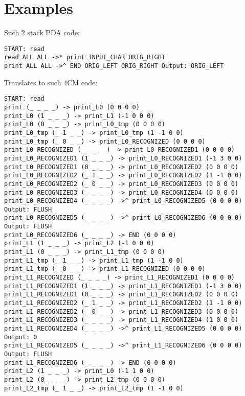 \documentclass[english,shortabstract,mgr]{iithesis}
\begin{document}

{}

\newpage
\appendix

\chapter{Examples}


Such $2$ stack PDA code:

\begin{verbatim}
START: read
read ALL ALL ->* print INPUT_CHAR ORIG_RIGHT
print ALL ALL ->^ END ORIG_LEFT ORIG_RIGHT Output: ORIG_LEFT
\end{verbatim}

Translates to such $4$CM code:

\begin{verbatim}
START: read
print (_ _ _ _) -> print_L0 (0 0 0 0)
print_L0 (1 _ _ _) -> print_L1 (-1 0 0 0)
print_L0 (0 _ _ _) -> print_L0_tmp (0 0 0 0)
print_L0_tmp (_ 1 _ _) -> print_L0_tmp (1 -1 0 0)
print_L0_tmp (_ 0 _ _) -> print_L0_RECOGNIZED (0 0 0 0)
print_L0_RECOGNIZED (_ _ _ _) -> print_L0_RECOGNIZED1 (0 0 0 0)
print_L0_RECOGNIZED1 (1 _ _ _) -> print_L0_RECOGNIZED1 (-1 3 0 0)
print_L0_RECOGNIZED1 (0 _ _ _) -> print_L0_RECOGNIZED2 (0 0 0 0)
print_L0_RECOGNIZED2 (_ 1 _ _) -> print_L0_RECOGNIZED2 (1 -1 0 0)
print_L0_RECOGNIZED2 (_ 0 _ _) -> print_L0_RECOGNIZED3 (0 0 0 0)
print_L0_RECOGNIZED3 (_ _ _ _) -> print_L0_RECOGNIZED4 (0 0 0 0)
print_L0_RECOGNIZED4 (_ _ _ _) ->^ print_L0_RECOGNIZED5 (0 0 0 0) Output: FLUSH
print_L0_RECOGNIZED5 (_ _ _ _) ->^ print_L0_RECOGNIZED6 (0 0 0 0) Output: FLUSH
print_L0_RECOGNIZED6 (_ _ _ _) -> END (0 0 0 0)
print_L1 (1 _ _ _) -> print_L2 (-1 0 0 0)
print_L1 (0 _ _ _) -> print_L1_tmp (0 0 0 0)
print_L1_tmp (_ 1 _ _) -> print_L1_tmp (1 -1 0 0)
print_L1_tmp (_ 0 _ _) -> print_L1_RECOGNIZED (0 0 0 0)
print_L1_RECOGNIZED (_ _ _ _) -> print_L1_RECOGNIZED1 (0 0 0 0)
print_L1_RECOGNIZED1 (1 _ _ _) -> print_L1_RECOGNIZED1 (-1 3 0 0)
print_L1_RECOGNIZED1 (0 _ _ _) -> print_L1_RECOGNIZED2 (0 0 0 0)
print_L1_RECOGNIZED2 (_ 1 _ _) -> print_L1_RECOGNIZED2 (1 -1 0 0)
print_L1_RECOGNIZED2 (_ 0 _ _) -> print_L1_RECOGNIZED3 (0 0 0 0)
print_L1_RECOGNIZED3 (_ _ _ _) -> print_L1_RECOGNIZED4 (1 0 0 0)
print_L1_RECOGNIZED4 (_ _ _ _) ->^ print_L1_RECOGNIZED5 (0 0 0 0) Output: 0
print_L1_RECOGNIZED5 (_ _ _ _) ->^ print_L1_RECOGNIZED6 (0 0 0 0) Output: FLUSH
print_L1_RECOGNIZED6 (_ _ _ _) -> END (0 0 0 0)
print_L2 (1 _ _ _) -> print_L0 (-1 1 0 0)
print_L2 (0 _ _ _) -> print_L2_tmp (0 0 0 0)
print_L2_tmp (_ 1 _ _) -> print_L2_tmp (1 -1 0 0)

\end{verbatim}
\end{document}
